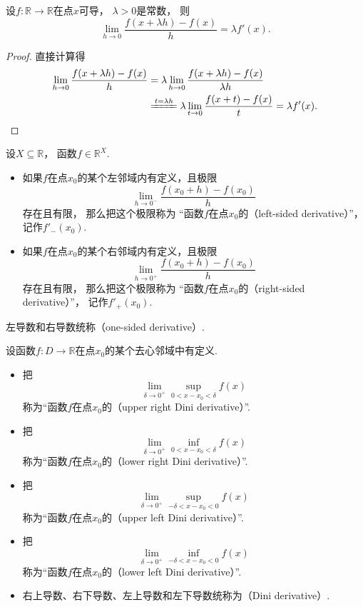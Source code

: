 \begin{proposition}
设\(f\colon\mathbb{R}\to\mathbb{R}\)在点\(x\)可导，
\(\lambda>0\)是常数，
则\[
	\lim_{h\to0} \frac{f(x+\lambda h)-f(x)}{h}
	= \lambda f'(x).
\]
\begin{proof}
直接计算得\begin{align*}
	\lim_{h\to0} \frac{f(x+\lambda h)-f(x)}{h}
	&= \lambda \lim_{h\to0} \frac{f(x+\lambda h)-f(x)}{\lambda h} \\
	&\xlongequal{t=\lambda h}
		\lambda \lim_{t\to0} \frac{f(x+t)-f(x)}{t}
	= \lambda f'(x).
	\qedhere
\end{align*}
\end{proof}
\end{proposition}

\begin{definition}
设\(X\subseteq\mathbb{R}\)，
函数\(f\in\mathbb{R}^X\).
\begin{itemize}
	\item 如果\(f\)在点\(x_0\)的某个左邻域内有定义，且极限\[
		\lim_{h\to0^-} \frac{f(x_0+h)-f(x_0)}{h}
	\]存在且有限，
	那么把这个极限称为
	“函数\(f\)在点\(x_0\)的（left-sided derivative）”，
	记作\(f'_-(x_0)\).
	\item 如果\(f\)在点\(x_0\)的某个右邻域内有定义，且极限\[
		\lim_{h\to0^+} \frac{f(x_0+h)-f(x_0)}{h}
	\]存在且有限，
	那么把这个极限称为
	“函数\(f\)在点\(x_0\)的（right-sided derivative）”，
	记作\(f'_+(x_0)\).
\end{itemize}
左导数和右导数统称（one-sided derivative）.
\end{definition}

\begin{definition}
设函数\(f\colon D\to\mathbb{R}\)在点\(x_0\)的某个去心邻域中有定义.
\begin{itemize}
	\item 把\[
		\lim_{\delta\to0^+} \sup_{0<x-x_0<\delta} f(x)
	\]称为“函数\(f\)在点\(x_0\)的（upper right Dini derivative）”.
	\item 把\[
		\lim_{\delta\to0^+} \inf_{0<x-x_0<\delta} f(x)
	\]称为“函数\(f\)在点\(x_0\)的（lower right Dini derivative）”.
	\item 把\[
		\lim_{\delta\to0^+} \sup_{-\delta<x-x_0<0} f(x)
	\]称为“函数\(f\)在点\(x_0\)的（upper left Dini derivative）”.
	\item 把\[
		\lim_{\delta\to0^+} \inf_{-\delta<x-x_0<0} f(x)
	\]称为“函数\(f\)在点\(x_0\)的（lower left Dini derivative）”.
	\item 右上导数、右下导数、左上导数和左下导数统称为（Dini derivative）.
\end{itemize}
\end{definition}

